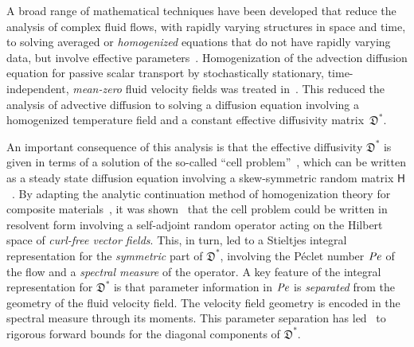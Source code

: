\documentclass[english,12pt,jmp,graphicx]{revtex4-1}
\newcommand{\Pen}{\mbox{\textit{Pe}}}  %
\newcommand{\Dg}{\mathfrak{D}}
\newcommand{\Hm}{\mathsf{H}}
\begin{document}
A broad range of mathematical techniques have been
developed that reduce the analysis of complex fluid flows, with
rapidly varying structures in space and time, to solving averaged or
\emph{homogenized} equations that do not have rapidly varying data,
but involve effective
parameters~\cite{McLaughlin:SIAM_JAM:780,Biferale:PF:2725,Fannjiang:1994:SIAM_JAM:333,Fannjiang:1997:1033,Pavliotis:PHD_Thesis,Majda:Kramer:1999:book,Majda:1994:10.1088,Xin:2009:Fronts:9780387876832}. Homogenization
of the advection diffusion equation for passive scalar transport by
stochastically stationary,
time-independent, \emph{mean-zero} fluid velocity fields was treated
in~\cite{McLaughlin:SIAM_JAM:780}. This reduced the analysis of
advective diffusion to solving a diffusion equation involving a
homogenized temperature field and a constant effective diffusivity
matrix~$\Dg^*$. 



An important consequence of this analysis is that the effective
diffusivity $\Dg^*$ is given in terms of a solution of the so-called
``cell problem''~\cite{McLaughlin:SIAM_JAM:780}, which can be written
as a steady state diffusion equation involving a skew-symmetric random
matrix $\Hm$~\cite{Avellaneda:PRL-753,Avellaneda:CMP-339,Fannjiang:1994:SIAM_JAM:333,Fannjiang:1997:1033}.  
By adapting the analytic continuation method of homogenization theory
for composite materials~\cite{Golden:CMP-473,Bergman:PRL-1285,Milton:APL-300}, it was
shown~\cite{Avellaneda:CMP-339,Avellaneda:PRL-753} that the cell
problem could be written in resolvent form involving a
self-adjoint random operator acting on the Hilbert space of
\emph{curl-free vector fields}. This, in turn, led to a Stieltjes
integral representation for the \emph{symmetric} part of $\Dg^*$,
involving the P{\'e}clet number $\Pen$ of the flow and a
\emph{spectral measure} of the operator.  A key feature of the
integral representation for $\Dg^*$ is that parameter information in
$\Pen$ is \emph{separated} from the geometry of the fluid velocity
field. The velocity field geometry 
is encoded in the spectral measure through its
moments. This parameter separation has
led~\cite{Avellaneda:CMP-339,Avellaneda:PRL-753,Fannjiang:1994:SIAM_JAM:333,Fannjiang:1997:1033}
to rigorous forward bounds for the diagonal components of $\Dg^*$. 
\end{document}
